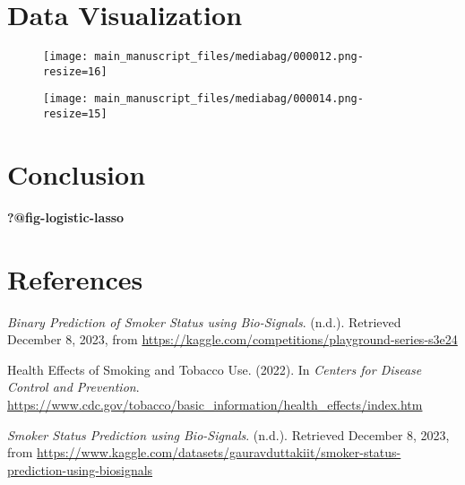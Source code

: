\documentclass[
  12pt,
  letterpaper,
]{article}
\newlength{\cslhangindent}
\newlength{\cslentryspacingunit} %
\newenvironment{CSLReferences}[2] %
 {%
  \setlength{\parindent}{0pt}
  \ifodd #1
  \let\oldpar\par
  \def\par{\hangindent=\cslhangindent\oldpar}
  \fi
  \setlength{\parskip}{#2\cslentryspacingunit}
 }%
 {}
\begin{document}
\hypertarget{data-visualization}{%
\section{Data Visualization}\label{data-visualization}}

\begin{figure}[!t]

{\centering \texttt{[image: main\_manuscript\_files/mediabag/000012.png-resize=16]}

}

\end{figure}

\begin{figure}[!t]

{\centering \texttt{[image: main\_manuscript\_files/mediabag/000014.png-resize=15]}

}

\end{figure}

\hypertarget{conclusion}{%
\section{Conclusion}\label{conclusion}}

\textbf{?@fig-logistic-lasso}

\hypertarget{bibliography}{%
\section*{References}\label{bibliography}}

\hypertarget{refs}{}
\begin{CSLReferences}{1}{0}
\leavevmode{}%
\emph{Binary {Prediction} of {Smoker} {Status} using {Bio}-{Signals}}.
(n.d.). Retrieved December 8, 2023, from
\url{https://kaggle.com/competitions/playground-series-s3e24}

\leavevmode{}%
Health {Effects} of {Smoking} and {Tobacco} {Use}. (2022). In
\emph{Centers for Disease Control and Prevention}.
\url{https://www.cdc.gov/tobacco/basic_information/health_effects/index.htm}

\leavevmode{}%
\emph{Smoker {Status} {Prediction} using {Bio}-{Signals}}. (n.d.).
Retrieved December 8, 2023, from
\url{https://www.kaggle.com/datasets/gauravduttakiit/smoker-status-prediction-using-biosignals}

\end{CSLReferences}
\end{document}
